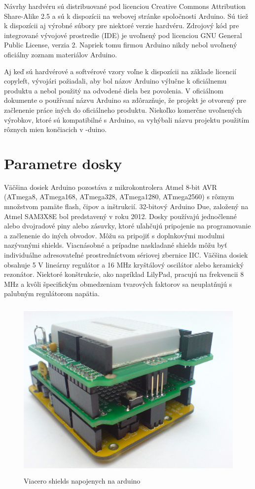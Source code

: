 Návrhy hardvéru sú distribuované pod licenciou Creative Commons Attribution Share-Alike 2.5 a sú k dispozícii na webovej stránke spoločnosti Arduino. Sú tiež k dispozícii aj výrobné súbory pre niektoré verzie hardvéru. Zdrojový kód pre integrované vývojové prostredie (IDE) je uvoľnený pod licenciou GNU General Public License, verzia 2. Napriek tomu firmou Arduino nikdy nebol uvoľnený oficiálny zoznam materiálov Arduino.

Aj keď sú hardvérové a softvérové vzory voľne k dispozícii na základe licencií copyleft, vývojári požiadali, aby bol názov Arduino výlučne k oficiálnemu produktu a nebol použitý na odvodené diela bez povolenia. V oficiálnom dokumente o používaní názvu Arduino sa zdôrazňuje, že projekt je otvorený pre začlenenie práce iných do oficiálneho produktu. Niekoľko komerčne uvoľnených výrobkov, ktoré sú kompatibilné s Arduino, sa vyhýbali názvu projektu použitím rôznych mien končiacich v -duino.

\section{Parametre dosky}

Väčšina dosiek Arduino pozostáva z mikrokontrolera Atmel 8-bit AVR (ATmega8, ATmega168, ATmega328, ATmega1280, ATmega2560) s rôznym množstvom pamäte flash, čipov a inštrukcií. 32-bitový Arduino Due, založený na Atmel SAM3X8E bol predstavený v roku 2012. Dosky používajú jednočlenné alebo dvojradové piny alebo zásuvky, ktoré uľahčujú pripojenie na programovanie a začlenenie do iných obvodov. Môžu sa pripojiť s doplnkovými modulmi nazývanými shields. Viacnásobné a prípadne naskladané shields môžu byť individuálne adresovateľné prostredníctvom sériovej zbernice IIC. Väčšina dosiek obsahuje 5 V lineárny regulátor a 16 MHz kryštálový oscilátor alebo keramický rezonátor. Niektoré konštrukcie, ako napríklad LilyPad, pracujú na frekvencii 8 MHz a kvôli špecifickým obmedzeniam tvarových faktorov sa neuplatňujú s palubným regulátorom napätia.

\begin{figure}[H]
	\begin{center}
		\includegraphics[height=9cm]{pics/shields.jpg}
		\caption{Viacero shields napojenych na arduino}
	\end{center}
\end{figure}

